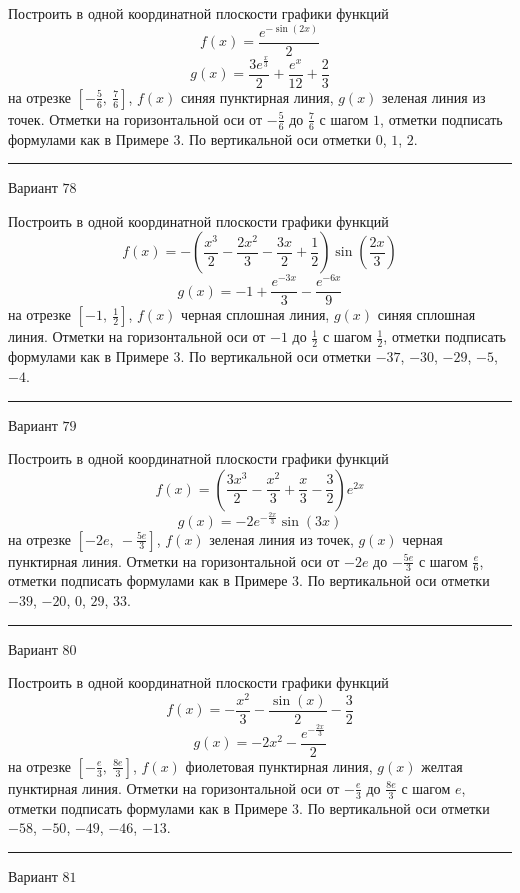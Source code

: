 \documentclass[11pt]{report}
\begin{document}
Построить в одной координатной плоскости графики функций $$f(x) = \frac{e^{- \sin{\left(2 x \right)}}}{2}$$ $$g(x) = \frac{3 e^{\frac{x}{3}}}{2} + \frac{e^{x}}{12} + \frac{2}{3}$$ на отрезке $\left[- \frac{5}{6}, \  \frac{7}{6}\right]$, $f(x)$ синяя пунктирная линия, $g(x)$ зеленая линия из точек. Отметки на горизонтальной оси от $- \frac{5}{6}$ до $\frac{7}{6}$ с шагом $1$, отметки подписать формулами как в Примере 3. По вертикальной оси отметки $0$, $1$, $2$.
\begin{center}
\noindent\rule{8cm}{0.4pt}
\end{center}
Вариант $78$


Построить в одной координатной плоскости графики функций $$f(x) = - \left(\frac{x^{3}}{2} - \frac{2 x^{2}}{3} - \frac{3 x}{2} + \frac{1}{2}\right) \sin{\left(\frac{2 x}{3} \right)}$$ $$g(x) = -1 + \frac{e^{- 3 x}}{3} - \frac{e^{- 6 x}}{9}$$ на отрезке $\left[-1, \  \frac{1}{2}\right]$, $f(x)$ черная сплошная линия, $g(x)$ синяя сплошная линия. Отметки на горизонтальной оси от $-1$ до $\frac{1}{2}$ с шагом $\frac{1}{2}$, отметки подписать формулами как в Примере 3. По вертикальной оси отметки $-37$, $-30$, $-29$, $-5$, $-4$.
\begin{center}
\noindent\rule{8cm}{0.4pt}
\end{center}
Вариант $79$


Построить в одной координатной плоскости графики функций $$f(x) = \left(\frac{3 x^{3}}{2} - \frac{x^{2}}{3} + \frac{x}{3} - \frac{3}{2}\right) e^{2 x}$$ $$g(x) = - 2 e^{- \frac{2 x}{3}} \sin{\left(3 x \right)}$$ на отрезке $\left[- 2 e, \  - \frac{5 e}{3}\right]$, $f(x)$ зеленая линия из точек, $g(x)$ черная пунктирная линия. Отметки на горизонтальной оси от $- 2 e$ до $- \frac{5 e}{3}$ с шагом $\frac{e}{6}$, отметки подписать формулами как в Примере 3. По вертикальной оси отметки $-39$, $-20$, $0$, $29$, $33$.
\begin{center}
\noindent\rule{8cm}{0.4pt}
\end{center}
Вариант $80$


Построить в одной координатной плоскости графики функций $$f(x) = - \frac{x^{2}}{3} - \frac{\sin{\left(x \right)}}{2} - \frac{3}{2}$$ $$g(x) = - 2 x^{2} - \frac{e^{- \frac{2 x}{3}}}{2}$$ на отрезке $\left[- \frac{e}{3}, \  \frac{8 e}{3}\right]$, $f(x)$ фиолетовая пунктирная линия, $g(x)$ желтая пунктирная линия. Отметки на горизонтальной оси от $- \frac{e}{3}$ до $\frac{8 e}{3}$ с шагом $e$, отметки подписать формулами как в Примере 3. По вертикальной оси отметки $-58$, $-50$, $-49$, $-46$, $-13$.
\begin{center}
\noindent\rule{8cm}{0.4pt}
\end{center}
Вариант $81$
\end{document}
